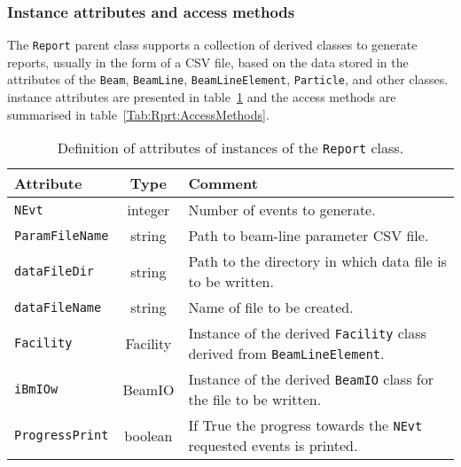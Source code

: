 \subsubsection{Instance attributes and access methods}
\label{Para:Rprt:InstAttr}
\noindent
The \texttt{Report} parent class supports a collection of derived
classes to generate reports, usually in the form of a CSV file, based
on the data stored in the attributes of
the \texttt{Beam}, \texttt{BeamLine}, \texttt{BeamLineElement}, \texttt{Particle},
and other classes.
instance attributes are presented in
table~\ref{Tab:Rprt:Attributes} and the access methods are summarised
in table~\ref{Tab:Rprt:AccessMethods}.
\begin{table}[h]
  \caption{
    Definition of attributes of instances of the \texttt{Report} class.
  }
  \label{Tab:Rprt:Attributes}
  \begin{center}
    \begin{tabular}{|l|c|p{11cm}|}
      \hline
      \textbf{Attribute} & \textbf{Type} & \textbf{Comment}                                                                      \\
      \hline
      \texttt{NEvt}          & integer  & Number of events to generate.                                                          \\
      \texttt{ParamFileName} & string   & Path to beam-line parameter CSV file.                                                  \\
      \texttt{dataFileDir}   & string   & Path to the directory in which data file is to be written.                             \\
      \texttt{dataFileName}  & string   & Name of file to be created.                                                            \\
      \texttt{Facility}      & Facility & Instance of the derived \texttt{Facility} class derived from \texttt{BeamLineElement}. \\
      \texttt{iBmIOw}        & BeamIO   & Instance of the derived \texttt{BeamIO} class for the file to be written.              \\
      \texttt{ProgressPrint} & boolean  & If True the progress towards the \texttt{NEvt} requested events is printed.            \\
      \hline
    \end{tabular}
  \end{center}
\end{table}
